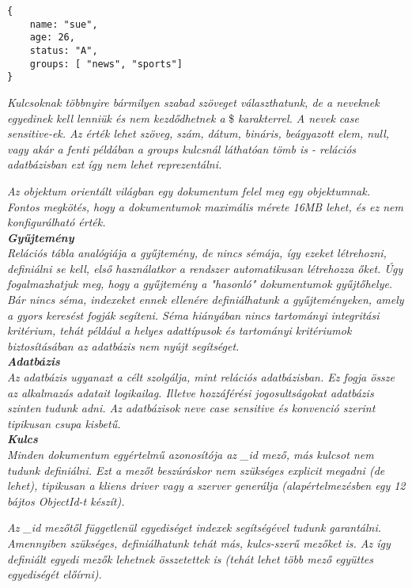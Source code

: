 \begin{verbatim}
{
    name: "sue",
    age: 26,
    status: "A",
    groups: [ "news", "sports"]
}
\end{verbatim}

\textit{Kulcsoknak többnyire bármilyen szabad szöveget választhatunk, de a neveknek egyedinek kell lenniük és nem kezdődhetnek a} \${} \textit{karakterrel. A nevek case sensitive-ek. Az érték lehet szöveg, szám, dátum, bináris, beágyazott elem, null, vagy akár a fenti példában a groups kulcsnál láthatóan tömb is - relációs adatbázisban ezt így nem lehet reprezentálni.}

\textit{Az objektum orientált világban egy dokumentum felel meg egy objektumnak. Fontos megkötés, hogy a dokumentumok maximális mérete 16MB lehet, és ez nem konfigurálható érték.}\\

\noindent\textit{\textbf{Gyűjtemény}}\\

\textit{Relációs tábla analógiája a gyűjtemény, de nincs sémája, így ezeket létrehozni, definiálni se kell, első használatkor a rendszer automatikusan létrehozza őket. Úgy fogalmazhatjuk meg, hogy a gyűjtemény a "hasonló" dokumentumok gyűjtőhelye. Bár nincs séma, indexeket ennek ellenére definiálhatunk a gyűjteményeken, amely a gyors keresést fogják segíteni. Séma hiányában nincs tartományi integritási kritérium, tehát például a helyes adattípusok és tartományi kritériumok biztosításában az adatbázis nem nyújt segítséget.}\\

\noindent\textit{\textbf{Adatbázis}}\\

\textit{Az adatbázis ugyanazt a célt szolgálja, mint relációs adatbázisban. Ez fogja össze az alkalmazás adatait logikailag. Illetve hozzáférési jogosultságokat adatbázis szinten tudunk adni. Az adatbázisok neve case sensitive és konvenció szerint tipikusan csupa kisbetű.}\\

\noindent\textit{\textbf{Kulcs}}\\

\textit{Minden dokumentum egyértelmű azonosítója az \_id mező, más kulcsot nem tudunk definiálni. Ezt a mezőt beszúráskor nem szükséges explicit megadni (de lehet), tipikusan a kliens driver vagy a szerver generálja (alapértelmezésben egy 12 bájtos ObjectId-t készít).}

\textit{Az \_id mezőtől függetlenül egyediséget indexek segítségével tudunk garantálni. \newline Amennyiben szükséges, definiálhatunk tehát más, kulcs-szerű mezőket is. Az így definiált egyedi mezők lehetnek összetettek is (tehát lehet több mező együttes egyediségét előírni).}

